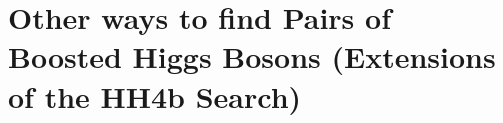 \chapter{Other ways to find Pairs of Boosted Higgs Bosons (Extensions of the HH4b Search)}
\label{chap:five}

\lipsum[1-12]
